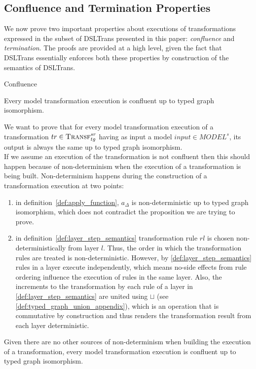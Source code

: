 
\subsection{Confluence and Termination Properties}

We now prove two important properties about executions of transformations expressed in the subset of DSLTrans presented in this paper: \emph{confluence} and \emph{termination}. The proofs are provided at a high level, given the fact that DSLTrans essentially enforces both these properties by construction of the semantics of DSLTrans.

\begin{proposition}{Confluence}

Every model transformation execution is confluent up to typed graph isomorphism.
\end{proposition}
\begin{pf}
We want to prove that for every model transformation execution of a transformation $tr\in \textsc{Transf}^{sr}_{tg}$ having as input a model $input \in MODEL^{s}$, its output is always the same up to typed graph isomorphism.\\
If we assume an execution of the transformation is not confluent then this should happen because of non-determinism when the execution of a transformation is being built. Non-determinism happens during the construction of a transformation execution at two points: 
\begin{enumerate}
\item in definition~\ref{def:apply_function}, $a_{\Delta}$ is non-deterministic up to typed graph isomorphism, which does not contradict the proposition we are trying to prove.
\item in definition~\ref{def:layer_step_semantics} transformation rule $rl$ is chosen non-deterministically from layer $l$. Thus, the order in which the transformation rules are treated is non-deterministic. However, by \cref{def:layer_step_semantics} rules in a layer execute independently, which means no-side effects from rule ordering influence the execution of rules in the same layer. Also, the increments to the transformation by each rule of a layer in \cref{def:layer_step_semantics} are united using $\sqcup$ (see \cref{def:typed_graph_union_appendix}), which is an operation that is commutative by construction and thus renders the transformation result from each layer deterministic. 
\end{enumerate}
Given there are no other sources of non-determinism when building the execution of a transformation, every model transformation execution is confluent up to typed graph isomorphism.
\end{pf}

